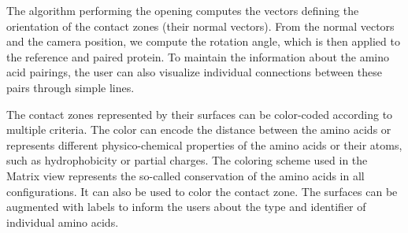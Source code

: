\documentclass{bmcart}
\def\ExpView {Exploded view\xspace}
\def\MatView {Matrix view\xspace}
\begin{document}
The algorithm performing the opening computes the vectors defining the orientation of the contact zones (their normal vectors). 
From the normal vectors and the camera position, we compute the rotation angle, which is then applied to the reference and paired protein.
To maintain the information about the amino acid pairings, the user can also visualize individual connections between these pairs through simple lines.


The contact zones represented by their surfaces can be color-coded according to multiple criteria.
The color can encode the distance between the amino acids or represents different physico-chemical properties of the amino acids or their atoms, such as hydrophobicity or partial charges.
The coloring scheme used in the \MatView represents the so-called conservation of the amino acids in all configurations.
It can also be used to color the contact zone.
The surfaces can be augmented with labels to inform the users about the type and identifier of individual amino acids.
\end{document}
